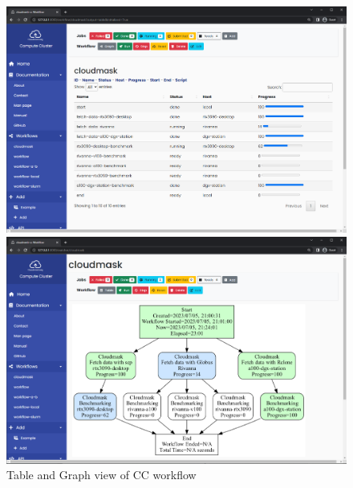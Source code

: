 \documentclass[utf8]{FrontiersinVancouver} %
\begin{document}
\begin{figure}[htb]
\begin{minipage}[t]{0.49\columnwidth}
\centering  \includegraphics[width=1.0\columnwidth]{images/table-cloudmask-workflow.png}
\end{minipage}
\hfill
\begin{minipage}[t]{0.49\columnwidth}
  \includegraphics[width=1.0\columnwidth]{images/gui-cloudmask-workflow.png}
\end{minipage}
 \caption{Table and Graph view of CC workflow}
\label{fig:gui-view}
\vspace{-0.5cm}
\end{figure}
\end{document}
